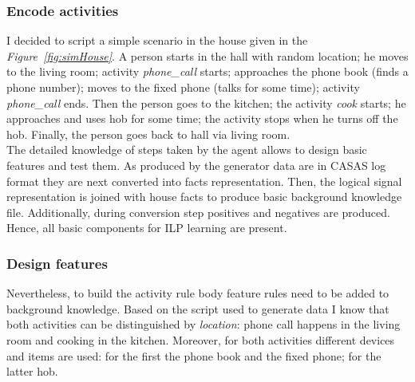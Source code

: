 \documentclass[11pt, a4paper, pdflatex, leqno, twoside, openright]{report}
\begin{document}
      \subsubsection{Encode activities}
I decided to script a simple scenario in the house given in the \emph{Figure~\ref{fig:simHouse}}. A person starts in the hall with random location; he moves to the living room; activity \emph{phone\_call} starts; approaches the phone book (finds a phone number); moves to the fixed phone (talks for some time); activity \emph{phone\_call} ends. Then the person goes to the kitchen; the activity \emph{cook} starts; he approaches and uses hob for some time; the activity stops when he turns off the hob. Finally, the person goes back to hall via living room.\\

The detailed knowledge of steps taken by the agent allows to design basic features and test them. As produced by the generator data are in CASAS log format they are next converted into facts representation. Then, the logical signal representation is joined with house facts to produce basic background knowledge file. Additionally, during conversion step positives and negatives are produced. Hence, all basic components for ILP learning are present.

      \subsubsection{Design features}
Nevertheless, to build the activity rule body feature rules need to be added to background knowledge. Based on the script used to generate data I know that both activities can be distinguished by \emph{location}: phone call happens in the living room and cooking in the kitchen. Moreover, for both activities different devices and items are used: for the first the phone book and the fixed phone; for the latter hob.\\
\end{document}
